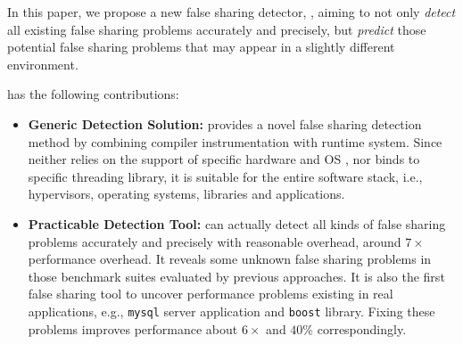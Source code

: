 In this paper, we propose a new false sharing detector, , aiming to
not only {\it detect} all existing false sharing problems accurately and precisely,
but {\it predict} those potential 
false sharing problems that may appear in a slightly different environment. 

\Defaults{} has the following contributions:
\begin{itemize}
\item
\textbf{Generic Detection Solution:} provides a novel false sharing detection method by
combining compiler instrumentation with runtime system.
Since  neither relies on the support of specific hardware and OS ,
nor binds to specific threading library, 
it is suitable for the entire software stack, 
i.e., hypervisors, operating systems, libraries and applications. 

\item
\textbf{Practicable Detection Tool:}  can actually detect all kinds of false sharing problems accurately and precisely 
with reasonable overhead, around $7\times$ performance overhead. 
It reveals some unknown false sharing problems in those benchmark suites evaluated by 
previous approaches.
It is also the first false sharing tool to uncover performance problems existing in real applications, e.g.,
\texttt{mysql} server application and \texttt{boost} library. Fixing these problems 
improves performance about $6\times$ and $40\%$ correspondingly.


\end{itemize}
